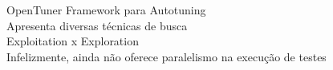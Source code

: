 \documentclass[10pt]{beamer}
\begin{document}
\begin{frame}{OpenTuner}
	Framework para Autotuning\pause\\
	Apresenta diversas técnicas de busca\pause\\
	Exploitation x Exploration\pause\\
	Infelizmente, ainda não oferece paralelismo na execução de testes
\end{frame}
%
%  
%
%



%		
\end{document}
